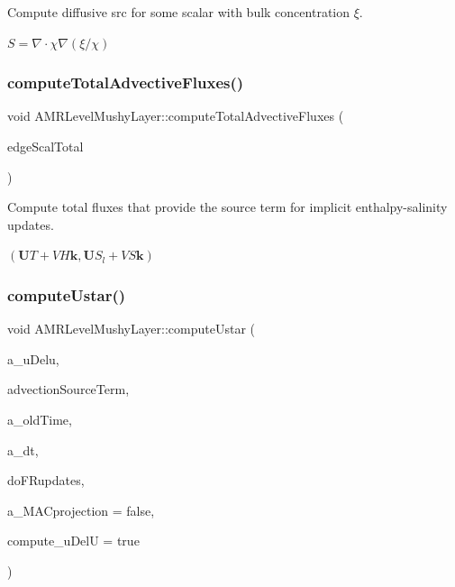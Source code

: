 Compute diffusive src for some scalar with bulk concentration $ \xi $. 

$ S = \nabla \cdot \chi \nabla (\xi/\chi)$ \mbox{\label{class_a_m_r_level_mushy_layer_a8f04027bc844bd17a8bed1e073978436}} 
\subsubsection{\texorpdfstring{compute\+Total\+Advective\+Fluxes()}{computeTotalAdvectiveFluxes()}}
{\footnotesize\ttfamily void A\+M\+R\+Level\+Mushy\+Layer\+::compute\+Total\+Advective\+Fluxes (\begin{DoxyParamCaption}\item[{\textbf{ Level\+Data}$<$ \textbf{ Flux\+Box} $>$ \&}]{edge\+Scal\+Total }\end{DoxyParamCaption})\hspace{0.3cm}{\ttfamily [protected]}}



Compute total fluxes that provide the source term for implicit enthalpy-\/salinity updates. 

$ (\mathbf{U} T + V H \mathbf{k}, \mathbf{U} S_l + V S \mathbf{k})$ \mbox{\label{class_a_m_r_level_mushy_layer_ae4a68a07aa1a72f00379d30039bc8567}} 
\subsubsection{\texorpdfstring{compute\+Ustar()}{computeUstar()}}
{\footnotesize\ttfamily void A\+M\+R\+Level\+Mushy\+Layer\+::compute\+Ustar (\begin{DoxyParamCaption}\item[{\textbf{ Level\+Data}$<$ \textbf{ F\+Array\+Box} $>$ \&}]{a\+\_\+u\+Delu,  }\item[{const \textbf{ Level\+Data}$<$ \textbf{ F\+Array\+Box} $>$ \&}]{advection\+Source\+Term,  }\item[{\textbf{ Real}}]{a\+\_\+old\+Time,  }\item[{\textbf{ Real}}]{a\+\_\+dt,  }\item[{bool}]{do\+F\+Rupdates,  }\item[{bool}]{a\+\_\+\+M\+A\+Cprojection = {\ttfamily false},  }\item[{bool}]{compute\+\_\+u\+DelU = {\ttfamily true} }\end{DoxyParamCaption})\hspace{0.3cm}{\ttfamily [protected]}}




